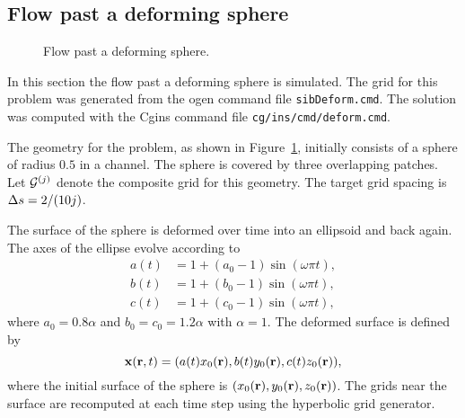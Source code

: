 \clearpage
\subsection{Flow past a deforming sphere}\label{sec:deformingSphere}


{%
% 
\newcommand{\figWidtha}{5.75cm}
\newcommand{\trimfiga}[2]{\trimPlotb{#1}{#2}{.15}{.15}{.12}{.12}}
% 
\begin{figure}[hbt]
\begin{center}
\end{center}
 \caption{Flow past a deforming sphere.}
  \label{fig:deformingSphere}
\end{figure}
%
}%


In this section the flow past a deforming sphere is simulated.
The grid for this problem was generated from the ogen command file {\tt sibDeform.cmd}.
The solution was computed with the Cgins command file {\tt cg/ins/cmd/deform.cmd}.

The geometry for the problem, as shown in Figure~\ref{fig:deformingSphere},
initially consists of a sphere of radius $0.5$ in a channel. 
The sphere is covered by three overlapping patches. 
Let ${\mathcal G}^{(j)}$ denote the composite grid for this geometry. The target grid spacing is $\Delta s=2/(10 j)$.

The surface of the sphere is deformed over time into an ellipsoid and back again. The axes of the
ellipse evolve according to 
\begin{align*}
     a(t) &= 1 + (a_0-1)\sin(\omega \pi t ), \\
     b(t) &= 1 + (b_0-1)\sin(\omega \pi t ), \\
     c(t) &= 1 + (c_0-1)\sin(\omega \pi t ),
\end{align*}
where $a_0=0.8\alpha$ and $b_0=c_0=1.2\alpha$ with $\alpha=1$. 
The deformed surface is defined by 
\[
  \mathbf{ x}(\mathbf{ r},t) = (a(t) x_0(\mathbf{ r}), b(t) y_0(\mathbf{ r}), c(t) z_0(\mathbf{ r})), 
\]
where the initial surface
of the sphere is $(x_0(\mathbf{ r}),y_0(\mathbf{ r}),z_0(\mathbf{ r}))$. 
The grids near the surface are recomputed at each time step using the hyperbolic grid generator.




